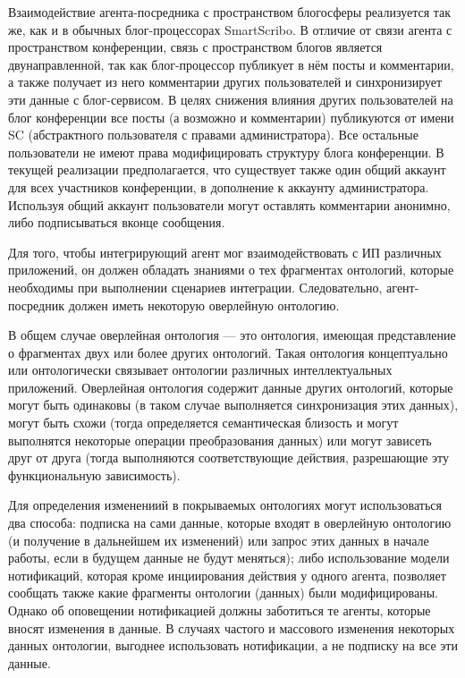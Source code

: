 Взаимодействие агента-посредника с пространством блогосферы реализуется так же, как и в обычных блог-процессорах SmartScribo. В отличие от связи агента с пространством конференции, связь с пространством блогов является двунаправленной, так как блог-процессор публикует в нём посты и комментарии, а также получает из него комментарии других пользователей и синхронизирует эти данные с блог-сервисом. В целях снижения влияния других пользователей на блог конференции все посты (а возможно и комментарии) публикуются от имени SC (абстрактного пользователя с правами администратора). Все остальные пользователи не имеют права модифицировать структуру блога конференции. В текущей реализации предполагается, что существует также один общий аккаунт для всех участников конференции, в дополнение к аккаунту администратора. Используя общий аккаунт пользователи могут оставлять комментарии анонимно, либо подписываться вконце сообщения. 

Для того, чтобы интегрирующий агент мог взаимодействовать с ИП различных приложений, он должен обладать знаниями о тех фрагментах онтологий, которые необходимы при выполнении сценариев интеграции. Следовательно, агент-посредник должен иметь некоторую оверлейную онтологию.

В общем случае оверлейная онтология --- это онтология, имеющая представление о фрагментах двух или более других онтологий. Такая онтология концептуально или онтологически связывает онтологии различных интеллектуальных приложений. Оверлейная онтология содержит данные других онтологий, которые могут быть одинаковы (в таком случае выполняется синхронизация этих данных), могут быть схожи (тогда определяется семантическая близость и могут выполнятся некоторые операции преобразования данных) или могут зависеть друг от друга (тогда выполняются соответствующие действия, разрешающие эту функциональную зависимость).

Для определения изменениий в покрываемых онтологиях могут использоваться два способа: подписка на сами данные, которые входят в оверлейную онтологию (и получение в дальнейшем их изменений) или запрос этих данных в начале работы, если в будущем данные не будут меняться); либо использование модели нотификаций, которая кроме инциирования действия у одного агента, позволяет сообщать также какие фрагменты онтологии (данных) были модифицированы. Однако об оповещении нотификацией должны заботиться те агенты, которые вносят изменения в данные. В случаях частого и массового изменения некоторых данных онтологии, выгоднее использовать нотификации, а не подписку на все эти данные.

